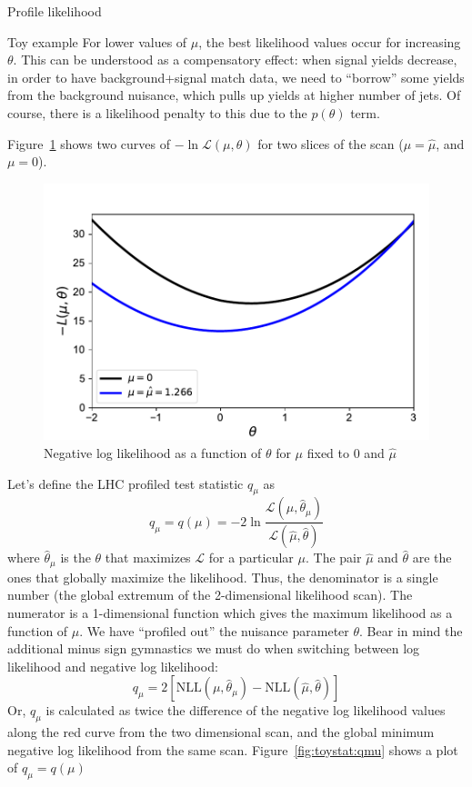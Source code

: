 \begin{section}{Profile likelihood}
\begin{subsection}{Toy example}
For lower values of $\mu$, the best likelihood values occur
for increasing $\theta$. This can be understood as a compensatory effect: when
signal yields decrease, in order to have background+signal match data,
we need to ``borrow'' some yields from the background nuisance, which
pulls up yields at higher number of jets. Of course, there is a likelihood penalty
to this due to the $p(\theta)$ term.

Figure~\ref{fig:toystat:theta} shows two curves of
$-\ln\mathcal{L}(\mu,\theta)$ for two
slices of the scan ($\mu=\hat{\mu}$, and $\mu=0$).

\begin{figure}[!htb]
    \centering
    \includegraphics[width=0.80\linewidth]{figs/toy_statistics/likelihood_vs_theta.pdf}
    \caption{
Negative log likelihood as a function of $\theta$ for $\mu$ fixed to 0 and $\hat{\mu}$
    }
    \label{fig:toystat:theta}
\end{figure}

Let's define the LHC profiled test statistic $q_\mu$ as 
\begin{equation}
q_\mu = q(\mu) = -2\ln\frac{\mathcal{L}(\mu,\hat{\theta}_\mu)}{\mathcal{L}(\hat{\mu},\hat{\theta})}
\end{equation}
 where $\hat{\theta}_\mu$ is the $\theta$ that maximizes
$\mathcal{L}$ for a particular $\mu$. The pair $\hat{\mu}$ and
$\hat{\theta}$ are the ones that globally maximize the likelihood.
Thus, the denominator is a single number (the global extremum of the
2-dimensional likelihood scan). The numerator is a 1-dimensional function
which gives the maximum likelihood as a function of $\mu$. We have
``profiled out'' the nuisance parameter $\theta$. Bear in mind the
additional minus sign gymnastics we must do when switching between log
likelihood and negative log likelihood: 
\begin{equation}
q_\mu = 2\left[\mathrm{NLL}(\mu,\hat{\theta}_\mu) - \mathrm{NLL}(\hat{\mu},\hat{\theta})\right]
\end{equation}
 Or, $q_\mu$ is calculated as twice the difference of the negative log likelihood values
along the red curve from the two dimensional scan, and the global minimum negative log likelihood
from the same scan. Figure~\ref{fig:toystat:qmu} shows a plot of $q_\mu = q(\mu)$


\end{subsection}
\end{section}
